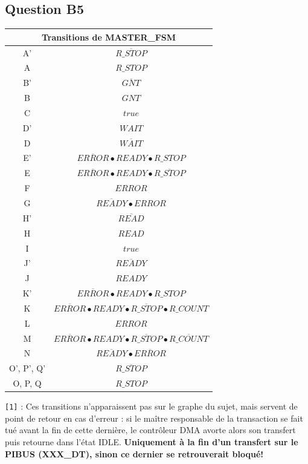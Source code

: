 \documentclass[10pt]{article}
\begin{document}
\subsection{Question B5}
\begin{center}
  \begin{tabular}{|c|c|}
    \hline
    \multicolumn{2}{|c|}{Transitions de MASTER\_FSM} \\ \hline
    A'  & $\overline{R\_STOP}$ \\ \hline
    A   & $R\_STOP$ \\ \hline
    B'  & $\overline{GNT}$ \\ \hline
    B   & $GNT$ \\ \hline
    C   & $true$ \\ \hline
    D'  & $WAIT$ \\ \hline
    D   & $\overline{WAIT}$ \\ \hline
    E'\footnote[1] & $\overline{ERROR}\bullet{READY}\bullet{R\_STOP}$ \\ \hline
    E   & $\overline{ERROR}\bullet{READY}\bullet\overline{R\_STOP}$ \\ \hline
    F   & $ERROR$ \\ \hline
    G   & $\overline{READY}\bullet{ERROR}$ \\ \hline
    H'  & $\overline{READ}$ \\ \hline
    H   & $READ$ \\ \hline
    I   & $true$ \\ \hline
    J'  & $\overline{READY}$ \\ \hline
    J   & $READY$ \\ \hline
    K'\footnote[1] & $\overline{ERROR}\bullet{READY}\bullet{R\_STOP}$ \\ \hline
    K   & $\overline{ERROR}\bullet{READY}\bullet\overline{R\_STOP}\bullet{R\_COUNT}$ \\ \hline
    L   & ${ERROR}$ \\ \hline
    M   & $\overline{ERROR}\bullet{READY}\bullet\overline{R\_STOP}\bullet\overline{R\_COUNT}$ \\ \hline
    N   & $\overline{READY}\bullet\overline{ERROR}$ \\ \hline
    O', P', Q' & $\overline{R\_STOP}$ \\ \hline
    O, P, Q & $R\_STOP$ \\ \hline
  \end{tabular}
\end{center}

\texttt{[1]} : Ces transitions n'apparaissent pas sur le graphe du sujet, mais
servent de point de retour en cas d'erreur : si le maître responsable de la
transaction se fait tué avant la fin de cette dernière, le contrôleur DMA
avorte alors son transfert puis retourne dans l'état IDLE. {\bf Uniquement à
la fin d'un transfert sur le PIBUS (XXX\_DT), sinon ce dernier se retrouverait
bloqué!}
\end{document}
